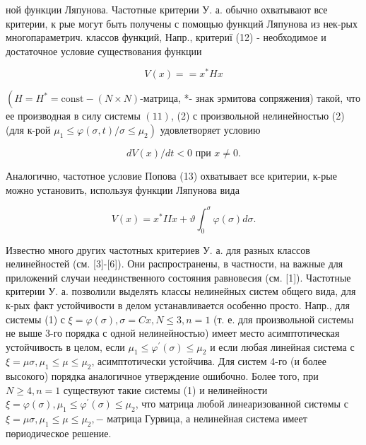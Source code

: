 \documentclass[10pt]{article}
\begin{document}
ной функции Ляпунова. Частотные критерии У. а. обычно охватывают все критерии, к рые могут быть получены с помощью функций Ляпунова из нек-рых многопараметрич. классов функций, Напр., критериї (12) - необходимое и достаточное условие существования функции



\[

V(x)==x^{*} H x

\]



$\left(H=H^{*}=\mathrm{const}-(N \times N)\right.$-матрица, *- знак эрмитова сопряжения) такой, что ее производная в силу системы $(11)$, (2) с произвольной нелинейностью (2) (для к-рой $\left.\mu_{1} \leqslant \varphi(\sigma, t) / \sigma \leqslant \mu_{2}\right)$ удовлетворяет условию



\[

d V(x) / d t<0 \text { при } x \neq 0 .

\]



Аналогично, частотное условие Попова (13) охватывает все критерии, к-рые можно установить, используя функции Ляпунова вида



\[

V(x)=x^{*} I I x+\vartheta \int_{0}^{\sigma} \varphi(\sigma) d \sigma .

\]



Известно много других частотных критериев У. а. для разных классов нелинейностей (см. [3]-[6]). Они распространены, в частности, на важные для приложений случаи неединственного состояния равновесия (см. [1]). Частотные критерии У. а. позволили выделять классы нелинейных систем общего вида, для к-рых факт устойчивости в делом устанавливается особенно просто. Напр., для системы (1) с $\xi=\varphi(\sigma), \sigma=C x, N \leqslant 3, n=1$ (т. е. для произвольной системы не выше 3-го порядка с одной нелинейностью) имеет место асимптотическая устойчивость в целом, если $\mu_{1} \leqslant \varphi^{\prime}(\sigma) \leqslant \mu_{2}$ и если любая линейная система с $\xi=\mu \sigma, \mu_{1} \leqslant \mu \leqslant \mu_{2}$, асимптотически устойчива. Для систем 4-го (и более высокого) порядка аналогичное утверждение ошибочно. Более того, при $N \geqslant 4, n=1$ существуют такие системы (1) и нелинейности $\xi=\varphi(\sigma), \mu_{1} \leqslant \varphi^{\prime}(\sigma) \leqslant \mu_{2}$, что матрица любой линеаризованной систөмы с $\xi=\mu \sigma, \mu_{1} \leqslant \mu \leqslant \mu_{2},-$ матрица Гурвица, а нелинейная система имеет пөриодическое решение.
\end{document}
